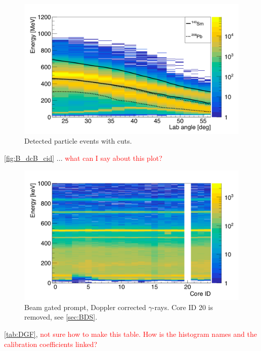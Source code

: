 \documentclass[twoside,english]{uiofysmaster/uiofysmaster}
\newcommand{\ga}{$\gamma$}
\let\orgautoref\autoref
\renewcommand{\autoref}
        {%
		 \def\subsectionautorefname{Section}%
		 \def\subsubsectionautorefname{Section}%
          \orgautoref}
\begin{document}
\begin{figure}[ht]
	\centering
	\includegraphics[width=\textwidth]{../Plots/plotting/particle-events-wcut.png}
	\caption{Detected particle events with cuts.}
	\label{fig:part_wcut}
\end{figure}


\autoref{fig:B_dcB_cid} ... \textcolor{red}{what can I say about this plot?}

\begin{figure}[ht]
	\centering
	\includegraphics[width=\textwidth]{../Plots/plotting/B_dcB_cid.png}
	\caption{Beam gated prompt, Doppler corrected \ga-rays. Core ID 20 is removed, see \autoref{sec:BDS}.}
	\label{fig:B_dcB_cid}
\end{figure}


\autoref{tab:DGF}, \textcolor{red}{not sure how to make this table. How is the histogram names and the calibration coefficients linked?}
\end{document}
